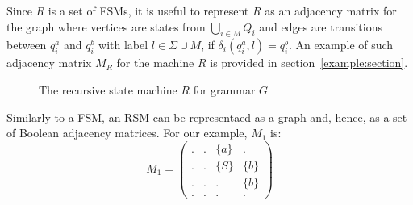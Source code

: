Since $R$ is a set of FSMs, it is useful to represent $R$ as an adjacency matrix for the graph where vertices are states from $\bigcup_{i \in M}Q_i$ and edges are transitions between $q_i^a$ and $q_i^b$ with label $l \in \Sigma \cup M$, if $\delta_i (q_i^a, l) = q_i^b$.
An example of such adjacency matrix $M_R$ for the machine $R$ is provided in section~\ref{example:section}.

\begin{figure}[h]
    \centering
    \caption{The recursive state machine $R$ for grammar $G$}
    \label{example:automata}
\end{figure}



Similarly to a FSM, an RSM can be representaed as a graph and, hence, as a set of Boolean adjacency matrices.
For our example, $M_1$ is:
    $$
    M_1 =
    \begin{pmatrix}
    . & . & \{a\} & .     \\
    . & . & \{S\} & \{b\} \\
    . & . & . & \{b\}     \\
    . & . & . & .
    \end{pmatrix}
    $$

